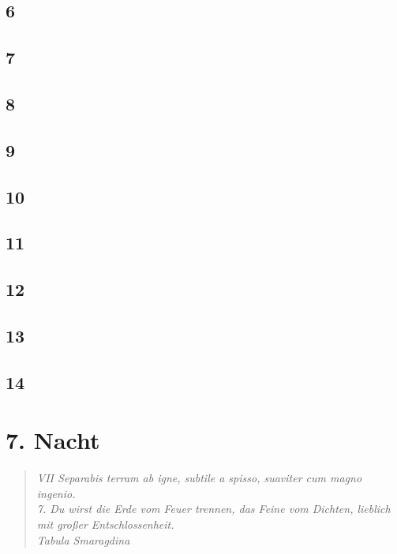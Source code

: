\documentclass[11pt,titlepage,a5paper]{book}
\begin{document}
\section*{6}

\section*{7}

\section*{8}

\section*{9}

\section*{10}

\section*{11}

\section*{12}

\section*{13}

\section*{14}



\chapter*{7. Nacht}



\begin{quotation}

\emph{VII Separabis terram ab igne, subtile a spisso, suaviter cum magno ingenio.\\7. Du wirst die Erde vom Feuer trennen, das Feine vom Dichten, lieblich mit großer Entschlossenheit.  \\Tabula Smaragdina}

\end{quotation}
\end{document}
